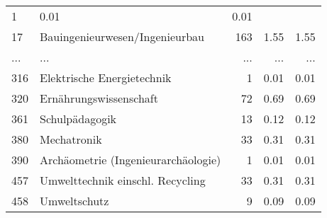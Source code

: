 \begin{longtable}{lXrrr}
          \num{1} &
          \num[round-mode=places,round-precision=2]{0.01} &
          \num[round-mode=places,round-precision=2]{0.01} \\
        17 & \multicolumn{1}{X}{Bauingenieurwesen/Ingenieurbau} & %
          \num{163} &
          \num[round-mode=places,round-precision=2]{1.55} &
          \num[round-mode=places,round-precision=2]{1.55} \\
       ... & ... & ... & ... & ... \\
        316 & \multicolumn{1}{X}{Elektrische Energietechnik} & %
          \num{1} &
          \num[round-mode=places,round-precision=2]{0.01} &
          \num[round-mode=places,round-precision=2]{0.01} \\

        320 & \multicolumn{1}{X}{Ernährungswissenschaft} & %
          \num{72} &
          \num[round-mode=places,round-precision=2]{0.69} &
          \num[round-mode=places,round-precision=2]{0.69} \\

        361 & \multicolumn{1}{X}{Schulpädagogik} & %
          \num{13} &
          \num[round-mode=places,round-precision=2]{0.12} &
          \num[round-mode=places,round-precision=2]{0.12} \\

        380 & \multicolumn{1}{X}{Mechatronik} & %
          \num{33} &
          \num[round-mode=places,round-precision=2]{0.31} &
          \num[round-mode=places,round-precision=2]{0.31} \\

        390 & \multicolumn{1}{X}{Archäometrie (Ingenieurarchäologie)} & %
          \num{1} &
          \num[round-mode=places,round-precision=2]{0.01} &
          \num[round-mode=places,round-precision=2]{0.01} \\

        457 & \multicolumn{1}{X}{Umwelttechnik einschl. Recycling} & %
          \num{33} &
          \num[round-mode=places,round-precision=2]{0.31} &
          \num[round-mode=places,round-precision=2]{0.31} \\

        458 & \multicolumn{1}{X}{Umweltschutz} & %
          \num{9} &
          \num[round-mode=places,round-precision=2]{0.09} &
          \num[round-mode=places,round-precision=2]{0.09} \\


\end{longtable}
